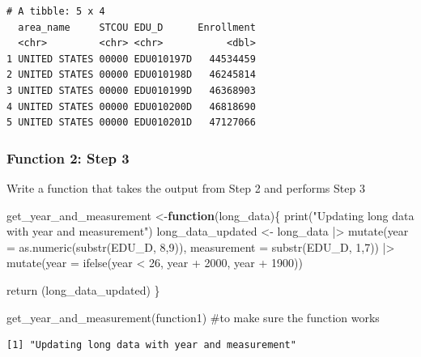 \documentclass[
  letterpaper,
  DIV=11,
  numbers=noendperiod]{scrartcl}
\newenvironment{Shaded}{\begin{snugshade}}{\end{snugshade}}
\newcommand{\AttributeTok}[1]{\textcolor[rgb]{0.40,0.45,0.13}{#1}}
\newcommand{\CommentTok}[1]{\textcolor[rgb]{0.37,0.37,0.37}{#1}}
\newcommand{\ControlFlowTok}[1]{\textcolor[rgb]{0.00,0.23,0.31}{\textbf{#1}}}
\newcommand{\DecValTok}[1]{\textcolor[rgb]{0.68,0.00,0.00}{#1}}
\newcommand{\FunctionTok}[1]{\textcolor[rgb]{0.28,0.35,0.67}{#1}}
\newcommand{\NormalTok}[1]{\textcolor[rgb]{0.00,0.23,0.31}{#1}}
\newcommand{\OtherTok}[1]{\textcolor[rgb]{0.00,0.23,0.31}{#1}}
\newcommand{\SpecialCharTok}[1]{\textcolor[rgb]{0.37,0.37,0.37}{#1}}
\newcommand{\StringTok}[1]{\textcolor[rgb]{0.13,0.47,0.30}{#1}}
\begin{document}
\begin{verbatim}
# A tibble: 5 x 4
  area_name     STCOU EDU_D      Enrollment
  <chr>         <chr> <chr>           <dbl>
1 UNITED STATES 00000 EDU010197D   44534459
2 UNITED STATES 00000 EDU010198D   46245814
3 UNITED STATES 00000 EDU010199D   46368903
4 UNITED STATES 00000 EDU010200D   46818690
5 UNITED STATES 00000 EDU010201D   47127066
\end{verbatim}

\subsubsection{Function 2: Step 3}\label{function-2-step-3}

Write a function that takes the output from Step 2 and performs Step 3

\begin{Shaded}
\begin{Highlighting}[]
\NormalTok{get\_year\_and\_measurement }\OtherTok{\textless{}{-}}\ControlFlowTok{function}\NormalTok{(long\_data)\{}
  \FunctionTok{print}\NormalTok{(}\StringTok{"Updating long data with year and measurement"}\NormalTok{)}
\NormalTok{  long\_data\_updated }\OtherTok{\textless{}{-}}\NormalTok{ long\_data }\SpecialCharTok{|\textgreater{}} 
    \FunctionTok{mutate}\NormalTok{(}\AttributeTok{year =} \FunctionTok{as.numeric}\NormalTok{(}\FunctionTok{substr}\NormalTok{(EDU\_D, }\DecValTok{8}\NormalTok{,}\DecValTok{9}\NormalTok{)), }
           \AttributeTok{measurement =} \FunctionTok{substr}\NormalTok{(EDU\_D, }\DecValTok{1}\NormalTok{,}\DecValTok{7}\NormalTok{)) }\SpecialCharTok{|\textgreater{}} 
    \FunctionTok{mutate}\NormalTok{(}\AttributeTok{year =} \FunctionTok{ifelse}\NormalTok{(year }\SpecialCharTok{\textless{}} \DecValTok{26}\NormalTok{, year }\SpecialCharTok{+} \DecValTok{2000}\NormalTok{, year }\SpecialCharTok{+} \DecValTok{1900}\NormalTok{))}
     
  \FunctionTok{return}\NormalTok{ (long\_data\_updated)}
\NormalTok{\}}

\FunctionTok{get\_year\_and\_measurement}\NormalTok{(function1) }\CommentTok{\#to make sure the function works}
\end{Highlighting}
\end{Shaded}

\begin{verbatim}
[1] "Updating long data with year and measurement"
\end{verbatim}
\end{document}
